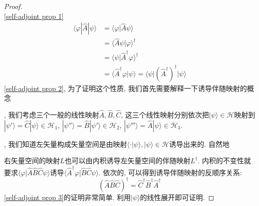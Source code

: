 \documentclass[a4paper,11pt]{book}
\newtheorem{proof}{证明}[section]
\begin{document}
\begin{proof}\quad\\
  \ref{self-adjoint prop 1}
  \begin{equation*}
    \begin{split}
       \langle\varphi|\hat{A}|\psi\rangle & =\langle\varphi|\hat{A}\psi\rangle \\
         & =\langle\hat{A}\psi|\varphi\rangle^\dag \\
         & =\langle\psi|\hat{A}^\dag\varphi\rangle^\dag \\
         & =\langle\hat{A}^\dag\varphi|\psi\rangle=\langle\psi|(\hat{A}^\dag)^\dag|\psi\rangle
    \end{split}
  \end{equation*}
  \ref{self-adjoint prop 2}, 为了证明这个性质, 我们首先需要解释一下诱导伴随映射的概念

  \begin{minipage}[b]{0.6\linewidth}
    , 我们考虑三个一般的线性映射$\hat{A},\hat{B},\hat{C}$, 这三个线性映射分别依次把$|\psi\rangle\in\mathcal{H}$映射到$|\psi'\rangle=\hat{C}|\psi\rangle\in\mathcal{H}_1$, $|\psi''\rangle=\hat{B}|\psi'\rangle\in\mathcal{H}_2$, $|\psi'''\rangle=\hat{A}|\psi\rangle\in\mathcal{H}_3$.

    , 我们知道左矢量构成矢量空间是由映射$\langle\cdot|\psi\rangle,|\psi\rangle\in\mathcal{H}$诱导出来的. 自然地
  \end{minipage}
  \begin{minipage}[b]{0.4\linewidth}
  \end{minipage}
  右矢量空间的映射$L$也可以由内积诱导左矢量空间的伴随映射$L^\dag$. 内积的不变性就要求$\langle\varphi|\hat{A}\hat{B}\hat{C}\psi\rangle$诱导$\langle\hat{A}^\dag\varphi|\hat{B}\hat{C}\psi\rangle$. 依次的, 可以得到诱导伴随映射的反顺序关系:
  \begin{equation*}
    (\hat{A}\hat{B}\hat{C})^\dag=\hat{C}^\dag\hat{B}^\dag\hat{A}^\dag
  \end{equation*}
  \ref{self-adjoint prop 3}的证明非常简单. 利用$|\psi\rangle$的线性展开即可证明.


\end{proof}
\end{document}
